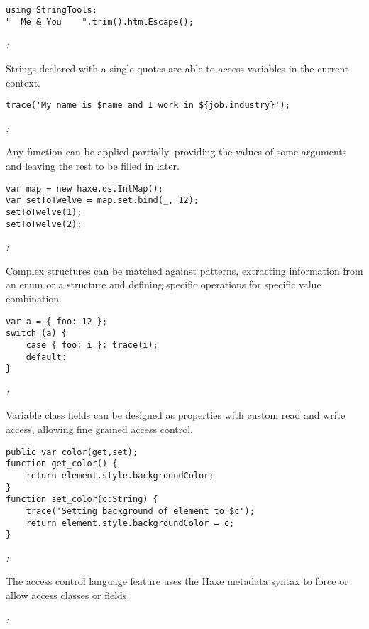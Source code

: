\begin{lstlisting}
using StringTools;
"  Me & You    ".trim().htmlEscape();
\end{lstlisting}

\emph{:}

Strings declared with a single quotes are able to access variables in the current context.

\begin{lstlisting}
trace('My name is $name and I work in ${job.industry}');
\end{lstlisting}

\emph{:} 

Any function can be applied partially, providing the values of some arguments and leaving the rest to be filled in later.

\begin{lstlisting}
var map = new haxe.ds.IntMap();
var setToTwelve = map.set.bind(_, 12);
setToTwelve(1);
setToTwelve(2);
\end{lstlisting}

\emph{:} 

Complex structures can be matched against patterns, extracting information from an enum or a structure and defining specific operations for specific value combination.

\begin{lstlisting}
var a = { foo: 12 };
switch (a) {
    case { foo: i }: trace(i);
    default:
}
\end{lstlisting}

\emph{:}

Variable class fields can be designed as properties with custom read and write access, allowing fine grained access control.
\begin{lstlisting}
public var color(get,set);
function get_color() {
    return element.style.backgroundColor;
}
function set_color(c:String) {
    trace('Setting background of element to $c');
    return element.style.backgroundColor = c;
}
\end{lstlisting}

\emph{:}

The access control language feature uses the Haxe metadata syntax to force or allow access classes or fields.

\emph{:}

